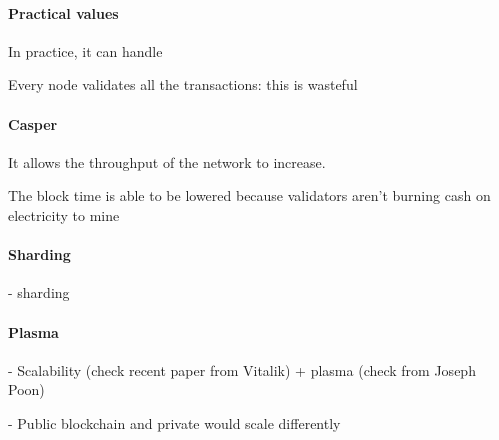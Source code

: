 \paragraph{Practical values}
In practice, it can handle

 Every node validates all the transactions: this is wasteful

\paragraph{Casper}
It allows the throughput of the network to increase.

The block time is able to be lowered because validators aren't burning cash on electricity to mine

\paragraph{Sharding}
- sharding

\paragraph{Plasma}
- Scalability (check recent paper from Vitalik) + plasma (check from Joseph Poon)

- Public blockchain and private would scale differently
\break

